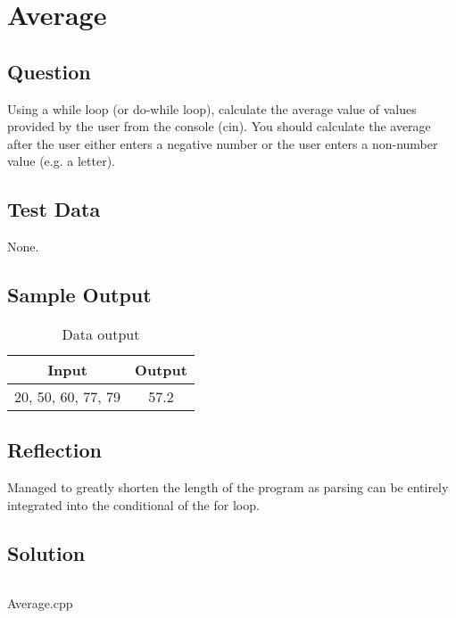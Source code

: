 \documentclass[main.tex]{subfiles}
\begin{document}
    \section{Average}
        \subsection{Question}
        Using a while loop (or do-while loop), calculate the average value of values provided by the user from the console (cin).
        You should calculate the average after the user either enters a negative number or the user enters a non-number value (e.g. a letter).
            
        \subsection{Test Data}
            None.
        
        \subsection{Sample Output}
            \begin{table}[H]
                \centering
                \begin{tabular}{c c}
                    \hline
                    \textbf{Input} & \textbf{Output} \\
                    \hline
                    20, 50, 60, 77, 79 & 57.2 \\
                    \hline
                \end{tabular}
                \caption{Data output}
            \end{table}

        \subsection{Reflection}
            Managed to greatly shorten the length of the program as parsing can
            be entirely integrated into the conditional of the for loop.
        
        \subsection{Solution}
            \begin{listing}[H]
                \inputminted{cpp}{../Tasks/06-Average/Average.cpp}%
                \caption{Average.cpp}
            \end{listing}
\end{document}
